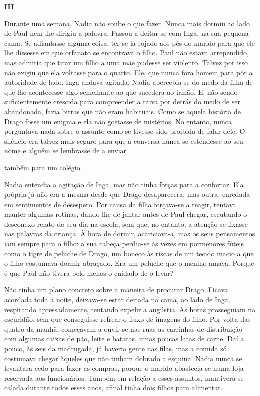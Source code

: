 \pagebreak
\vspace*{1.8cm}
\noindent{}\textbf{III}

\bigskip

Durante uma semana, Nadia não soube o que fazer. Nunca mais dormiu ao
lado de Paul nem lhe dirigiu a palavra. Passou a deitar-se com Inga, na
sua pequena cama. Se adiantasse alguma coisa, ter-se-ia rojado aos pés
do marido para que ele lhe dissesse em que orfanato se encontrava o
filho. Paul não estava arrependido, mas admitia que tirar um filho a uma
mãe pudesse ser violento. Talvez por isso não exigiu que ela voltasse
para o quarto. Ele, que nunca fora homem para pôr a autoridade de lado.
Inga andava agitada. Nadia apercebia-se do medo da filha de que lhe
acontecesse algo semelhante ao que sucedera ao irmão. E, não sendo
suficientemente crescida para compreender a raiva por detrás do medo de
ser abandonada, fazia birras que não eram habituais. Como se aquela
história de Drago fosse um enigma e ela não gostasse de mistérios. No
entanto, nunca perguntava nada sobre o assunto como se tivesse sido
proibida de falar dele. O silêncio era talvez mais seguro para que a
conversa nunca se estendesse ao seu nome e alguém se lembrasse de a
enviar

também para um colégio.



Nadia entendia a agitação de Inga, mas não tinha forças para a
confortar. Ela própria já não era a mesma desde que Drago desaparecera,
mas outra, enredada em sentimentos de desespero. Por causa da filha
forçava-se a reagir, tentava manter algumas rotinas, dando-lhe de jantar
antes de Paul chegar, escutando o desconexo relato do seu dia na escola,
sem que, no entanto, a atenção se fixasse nas palavras da criança. À
hora de dormir, acariciava-a, mas os seus pensamentos iam sempre para
o filho: a sua cabeça perdia-se às vezes em pormenores fúteis como o
tigre de peluche de Drago, um boneco às riscas de um tecido macio a que
o filho costumava dormir abraçado. Era um peluche que o menino amava.
Porque é que Paul não tivera pelo menos o cuidado de o levar?

Não tinha um plano concreto sobre a maneira de procurar Drago. Ficava acordada toda a noite, deixava-se estar deitada na
cama, ao lado de Inga, respirando apressadamente, tentando expelir a
angústia. As horas prosseguiam na escuridão, sem que conseguisse
refrear o fluxo de imagens do filho. Por volta das quatro da manhã,
começavam a ouvir-se nas ruas as carrinhas de distribuição com algumas
caixas de pão, leite e batatas, umas poucas latas de carne. Daí a pouco,
às seis da madrugada, já haveria gente nas filas, mas a comida só
costumava chegar àqueles que não tinham dobrado a esquina. Nadia nunca
se levantara cedo para fazer as compras, porque o marido abastecia-se
numa loja reservada aos funcionários. Também em relação a esses
assuntos, mantivera-se calada durante todos esses anos, afinal tinha
dois filhos para alimentar.


